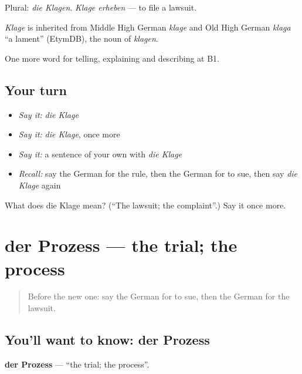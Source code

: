 Plural: \emph{die Klagen}. \emph{Klage erheben} — to file a lawsuit.

\begin{cousinweb}
\emph{Klage} is inherited from Middle High German \emph{klage} and Old High German \emph{klaga} \textquotedblleft{}a lament\textquotedblright{} (EtymDB), the noun of \emph{klagen}.
\end{cousinweb}

\begin{grammarlens}[title={What you've built}]
One more word for telling, explaining and describing at B1.
\end{grammarlens}

\subsection*{Your turn}
\begin{itemize}
\raggedright
  \item \emph{Say it:} \emph{die Klage}
  \item \emph{Say it:} \emph{die Klage}, once more
  \item \emph{Say it:} a sentence of your own with \emph{die Klage}
  \item \emph{Recall:} say the German for the rule, then the German for to sue, then say \emph{die Klage} again
\end{itemize}

\begin{tcolorbox}[breakable,colback=teal!4,colframe=teal!35!black,title={Before you move on}]
What does die Klage mean? (\textquotedblleft{}The lawsuit; the complaint\textquotedblright{}.) Say it once more.
\end{tcolorbox}
\section[der Prozess]{der Prozess — the trial; the process}

\label{lesson:GE-C386-prozess}



\begin{quote}
Before the new one: say the German for to sue, then the German for the lawsuit.
\end{quote}

\subsection*{You'll want to know: der Prozess}
\textbf{der Prozess} — \textquotedblleft{}the trial; the process\textquotedblright{}.

